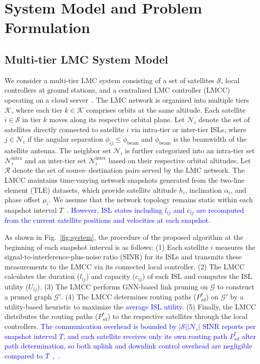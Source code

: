 \section{System Model and Problem Formulation}

\subsection{Multi-tier LMC System Model}

We consider a multi-tier LMC system consisting of a set of satellites $\mathcal{S}$, local controllers at ground stations, and a centralized LMC controller (LMCC) operating on a cloud server~\cite{hu2022software}. The LMC network is organized into multiple tiers $\mathcal{K}$, where each tier $k \in \mathcal{K}$ comprises orbits at the same altitude. Each satellite $i \in \mathcal{S}$ in tier $k$ moves along its respective orbital plane. Let $\mathcal{N}_i$ denote the set of satellites directly connected to satellite $i$ via intra-tier or inter-tier ISLs, where $j \in \mathcal{N}_i$ if the angular separation $\phi_{ij} \le \phi_{\mathrm{beam}}$ and $\phi_{\mathrm{beam}}$ is the beamwidth of the satellite antenna. The neighbor set $\mathcal{N}_i$ is further categorized into an intra-tier set $\mathcal{N}_i^{\mathrm{intra}}$ and an inter-tier set $\mathcal{N}_i^{\mathrm{inter}}$ based on their respective orbital altitudes. Let $\mathcal{R}$ denote the set of source--destination pairs served by the LMC network.
The LMCC maintains time-varying network snapshots generated from the two-line element (TLE) datasets, which provide satellite altitude $h_i$, inclination $\alpha_i$, and phase offset $\mu_i$. We assume that the network topology remains static within each snapshot interval $T$~\cite{han2023time}. \textcolor{blue}{However, ISL states including $l_{ij}$ and $c_{ij}$ are recomputed from the current satellite positions and velocities at each snapshot.}

As shown in Fig.~\ref{fig:system}, the procedure of the proposed algorithm at the beginning of each snapshot interval is as follows:
(1) Each satellite $i$ measures the signal-to-interference-plus-noise ratio (SINR) for its ISLs and transmits these measurements to the LMCC via its connected local controller.
(2) The LMCC calculates the duration ($l_{ij}$) and capacity ($c_{ij}$) of each ISL and computes the ISL utility ($U_{ij}$).
(3) The LMCC performs GNN-based link pruning on $\mathcal{G}$ to construct a pruned graph $\mathcal{G}'$.
(4) The LMCC determines routing paths ($P_{sd}^*$) on $\mathcal{G}'$ by a utility-based heuristic to maximize the \textcolor{blue}{average ISL utility}.
(5) Finally, the LMCC distributes the routing paths ($P_{sd}^*$) to the respective satellites through the local controllers.
\textcolor{blue}{The communication overhead is bounded by $|\mathcal{S}||\mathcal{N}_i|$ SINR reports per snapshot interval $T$, and each satellite receives only its own routing path $P_{sd}^*$ after path determination, so both uplink and downlink control overhead are negligible compared to $T$~\cite{han2023time},~\cite{hu2022software}.}


